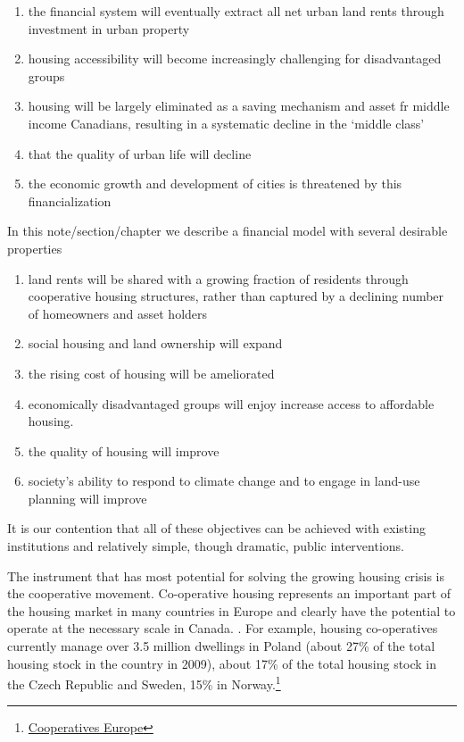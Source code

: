\begin{enumerate}
\item the financial system will eventually extract all net urban land rents through investment in urban property
\item housing accessibility will become increasingly challenging for disadvantaged groups
\item housing will be largely eliminated as a saving mechanism and asset fr middle income Canadians,  resulting in a systematic decline in the `middle class'
\item that the quality of urban life will decline
\item the economic growth and development of cities is threatened by this financialization
\end{enumerate}

 In this note/section/chapter we describe a financial model with several desirable properties
 
 \begin{enumerate}
     \item land rents will be shared with a growing fraction of residents through cooperative housing structures, rather than captured by a declining number of homeowners and asset holders
     \item social housing and land ownership will expand
     \item the rising cost of housing will be ameliorated
     \item economically disadvantaged groups will enjoy increase access to affordable housing.
     \item the quality of housing will improve
     \item society's ability to respond to climate change and to engage in land-use planning will improve     
 \end{enumerate}

 It is our contention that all of these objectives can be achieved with existing institutions and relatively simple, though dramatic, public interventions.

 The instrument that has most potential for solving the growing housing crisis is the cooperative movement. Co-operative housing represents an important part of the housing market in many countries in Europe and clearly have the potential to operate at the necessary scale in Canada. . For example, housing co-operatives currently manage over 3.5 million dwellings in Poland (about 27\% of the total housing stock in the country in 2009), about 17\% of the total housing stock in the Czech Republic and Sweden, 15\% in Norway.\footnote{\href{https://coopseurope.coop/cooperative-housing-key-model-sustainable-housing-europe-organised-cecodhas-housing/}{Cooperatives Europe}}

